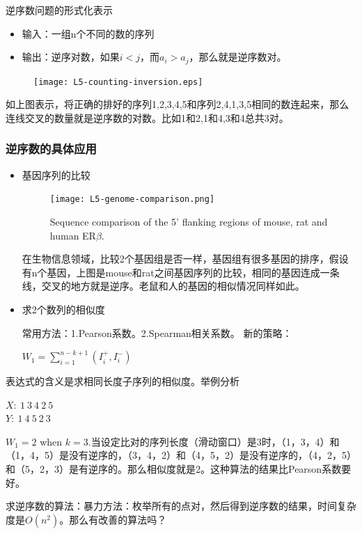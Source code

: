 逆序数问题的形式化表示
\begin{itemize}
 \item 
 输入：一组n个不同的数的序列
 \item
 输出：逆序对数，如果$i<j$，而$a_i>a_j$，那么就是逆序数对。
\end{itemize}

\begin{figure}[H]
\centering
 \texttt{[image: L5-counting-inversion.eps]}
\end{figure}

	如上图表示，将正确的排好的序列{1,2,3,4,5}和序列{2,4,1,3,5}相同的数连起来，那么连线交叉的数量就是逆序数的对数。比如1和2,1和4,3和4总共3对。


\subsubsection{逆序数的具体应用}
\begin{itemize}
\item
基因序列的比较
\begin{figure}[H]
\centering
 \texttt{[image: L5-genome-comparison.png]}
 \caption{Sequence comparison of the 5' flanking regions of mouse, rat and human ER$\beta$. } 
\end{figure}
	在生物信息领域，比较2个基因组是否一样，基因组有很多基因的排序，假设有n个基因，上图是mouse和rat之间基因序列的比较，相同的基因连成一条线，交叉的地方就是逆序。老鼠和人的基因的相似情况同样如此。
	
\item
求2个数列的相似度

常用方法：1.Pearson系数。2.Spearman相关系数。
新的策略： 
\begin{center} 
			 $W_1 = \sum_{i=1}^{n-k+1} (I_i^+, I_i^-)$ 
			 \end{center}
\end{itemize}
	表达式的含义是求相同长度子序列的相似度。举例分析
	\begin{center} 
$	X:\ 1\ 3\ 4\ 2\ 5$\\

$	Y:\ 1\ 4\ 5\ 2\ 3$
\end{center}
		
	$W_1 = 2$ when $k=3$.当设定比对的序列长度（滑动窗口）是3时，（1，3，4）和（1，4，5）是没有逆序的，（3，4，2）和（4，5，2）是没有逆序的，（4，2，5）和（5，2，3）是有逆序的。那么相似度就是2。这种算法的结果比Pearson系数要好。
	
	求逆序数的算法：暴力方法：枚举所有的点对，然后得到逆序数的结果，时间复杂度是$O(n^{2})$。那么有改善的算法吗？
